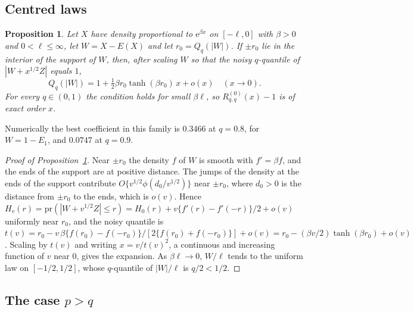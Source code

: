 \documentclass[11pt]{article}
\renewcommand{\_}{\usc\allowbreak}
\newtheorem{proposition}{Proposition}
\newcommand{\pr}{\mathrm{pr}}
\begin{document}
\subsection*{Centred laws}

\begin{proposition}\label{prop:centred}
Let $X$ have density proportional to $\mathrm{e}^{\beta x}$ on $[-\ell, 0]$ with $\beta > 0$ and $0 < \ell \le \infty$, let $W = X - E(X)$ and let $r_0 = Q_q(|W|)$. If $\pm r_0$ lie in the interior of the support of $W$, then, after scaling $W$ so that the noisy $q$-quantile of $|W + x^{1/2}Z|$ equals $1$,
\[
Q_q(|W|) = 1 + \tfrac{1}{2}\beta r_0\tanh(\beta r_0)\,x + o(x) \quad (x \to 0).
\]
For every $q \in (0,1)$ the condition holds for small $\beta\ell$, so $R^{(0)}_{q,q}(x) - 1$ is of exact order $x$.
\end{proposition}

Numerically the best coefficient in this family is $0.3466$ at $q = 0.8$, for $W = 1 - E_1$, and $0.0747$ at $q = 0.9$.

\begin{proof}[Proof of Proposition~\ref{prop:centred}]
Near $\pm r_0$ the density $f$ of $W$ is smooth with $f' = \beta f$, and the ends of the support are at positive distance. The jumps of the density at the ends of the support contribute $O\{v^{1/2}\phi(d_0/v^{1/2})\}$ near $\pm r_0$, where $d_0 > 0$ is the distance from $\pm r_0$ to the ends, which is $o(v)$. Hence $H_v(r) = \pr(|W + v^{1/2}Z| \le r) = H_0(r) + v\{f'(r) - f'(-r)\}/2 + o(v)$ uniformly near $r_0$, and the noisy quantile is $t(v) = r_0 - v\,\beta\{f(r_0) - f(-r_0)\}/[2\{f(r_0) + f(-r_0)\}] + o(v) = r_0 - (\beta v/2)\tanh(\beta r_0) + o(v)$. Scaling by $t(v)$ and writing $x = v/t(v)^2$, a continuous and increasing function of $v$ near $0$, gives the expansion. As $\beta\ell \to 0$, $W/\ell$ tends to the uniform law on $[-1/2, 1/2]$, whose $q$-quantile of $|W|/\ell$ is $q/2 < 1/2$.
\end{proof}

\subsection*{The case $p > q$}
\end{document}

